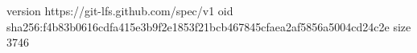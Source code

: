 version https://git-lfs.github.com/spec/v1
oid sha256:f4b83b0616cdfa415e3b9f2e1853f21bcb467845cfaea2af5856a5004cd24c2e
size 3746
